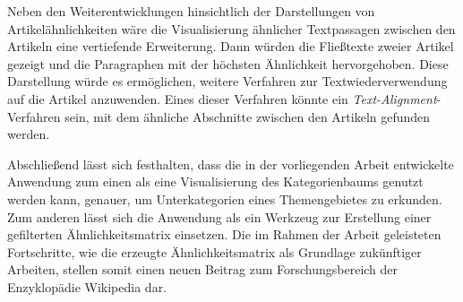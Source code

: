Neben den Weiterentwicklungen hinsichtlich der Darstellungen von Artikelähnlichkeiten wäre die Visualisierung ähnlicher Textpassagen zwischen den Artikeln eine vertiefende Erweiterung.
Dann würden die Fließtexte zweier Artikel gezeigt und die Paragraphen mit der höchsten Ähnlichkeit hervorgehoben.
Diese Darstellung würde es ermöglichen, weitere Verfahren zur Textwiederverwendung auf die Artikel anzuwenden.
Eines dieser Verfahren könnte ein \emph{Text-Alignment}-Verfahren sein, mit dem ähnliche Abschnitte zwischen den Artikeln gefunden werden.

Abschließend lässt sich festhalten, dass die in der vorliegenden Arbeit entwickelte Anwendung zum einen als eine Visualisierung des Kategorienbaums genutzt werden kann, genauer, um Unterkategorien eines Themengebietes zu erkunden.
Zum anderen lässt sich die Anwendung als ein Werkzeug zur Erstellung einer gefilterten Ähnlichkeitsmatrix einsetzen.
Die im Rahmen der Arbeit geleisteten Fortschritte, wie die erzeugte Ähnlichkeitsmatrix als Grundlage zukünftiger Arbeiten, stellen somit einen neuen Beitrag zum Forschungsbereich der Enzyklopädie Wikipedia dar.









